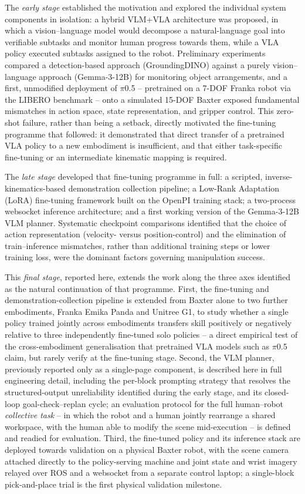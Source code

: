 \documentclass[12pt]{article}
\begin{document}
The \emph{early stage} established the motivation and explored the individual system components in isolation: a hybrid VLM+VLA architecture was proposed, in which a vision--language model would decompose a natural-language goal into verifiable subtasks and monitor human progress towards them, while a VLA policy executed subtasks assigned to the robot. Preliminary experiments compared a detection-based approach (GroundingDINO) against a purely vision--language approach (Gemma-3-12B) for monitoring object arrangements, and a first, unmodified deployment of $\pi$0.5 -- pretrained on a 7-DOF Franka robot via the LIBERO benchmark -- onto a simulated 15-DOF Baxter exposed fundamental mismatches in action space, state representation, and gripper control. This zero-shot failure, rather than being a setback, directly motivated the fine-tuning programme that followed: it demonstrated that direct transfer of a pretrained VLA policy to a new embodiment is insufficient, and that either task-specific fine-tuning or an intermediate kinematic mapping is required.

The \emph{late stage} developed that fine-tuning programme in full: a scripted, inverse-kinematics-based demonstration collection pipeline; a Low-Rank Adaptation (LoRA) fine-tuning framework built on the OpenPI training stack; a two-process websocket inference architecture; and a first working version of the Gemma-3-12B VLM planner. Systematic checkpoint comparisons identified that the choice of action representation (velocity- versus position-control) and the elimination of train--inference mismatches, rather than additional training steps or lower training loss, were the dominant factors governing manipulation success.

This \emph{final stage}, reported here, extends the work along the three axes identified as the natural continuation of that programme. First, the fine-tuning and demonstration-collection pipeline is extended from Baxter alone to two further embodiments, Franka Emika Panda and Unitree G1, to study whether a single policy trained jointly across embodiments transfers skill positively or negatively relative to three independently fine-tuned solo policies -- a direct empirical test of the cross-embodiment generalisation that pretrained VLA models such as $\pi$0.5 claim, but rarely verify at the fine-tuning stage. Second, the VLM planner, previously reported only as a single-page component, is described here in full engineering detail, including the per-block prompting strategy that resolves the structured-output unreliability identified during the early stage, and its closed-loop goal-check--replan cycle; an evaluation protocol for the full human--robot \emph{collective task} -- in which the robot and a human jointly rearrange a shared workspace, with the human able to modify the scene mid-execution -- is defined and readied for evaluation. Third, the fine-tuned policy and its inference stack are deployed towards validation on a physical Baxter robot, with the scene camera attached directly to the policy-serving machine and joint state and wrist imagery relayed over ROS and a websocket from a separate control laptop; a single-block pick-and-place trial is the first physical validation milestone.
\end{document}
